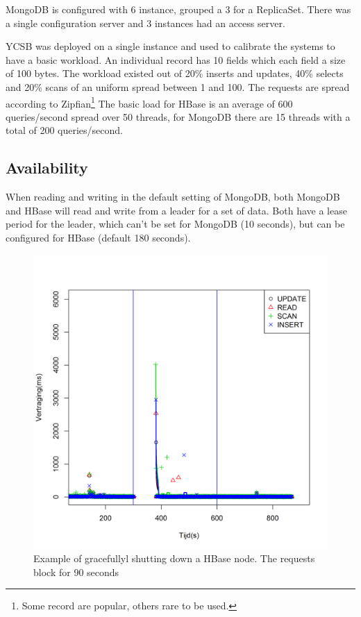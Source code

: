 \documentclass[final,5p,times]{elsarticle}
\begin{document}
MongoDB is configured with 6 instance, grouped a 3 for a ReplicaSet. There was a single configuration server and 3 instances had an access server. 

YCSB was deployed on a single instance and used to calibrate the systems to have a basic workload. An individual record has 10 fields which each field a size of 100 bytes. The workload existed out of 20\% inserts and updates, 40\% selects and 20\% scans of an uniform spread between 1 and 100. The requests are spread according to Zipfian\footnote{Some record are popular, others rare to be used.}  The basic load for HBase is an average of 600 queries/second spread over 50 threads, for MongoDB there are 15 threads with a total of 200 queries/second. 

\subsection{Availability}
When reading and writing in the default setting of MongoDB, both MongoDB and HBase will read and write from a leader for a set of data. Both have a lease period for the leader, which can't be set for MongoDB (10 seconds), but can be configured for HBase (default 180 seconds). 

\begin{figure}[h]
\centering
\includegraphics[width=\linewidth]{../img/Observaties/HBase/Stop-07-14-Soft-3-1.png}
\caption{Example of gracefullyl shutting down a HBase node. The requests block for 90 seconds }
\end{figure}
\end{document}
